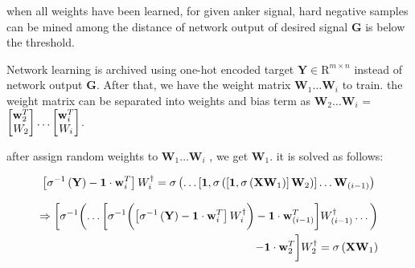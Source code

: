 \documentclass[runningheads]{llncs}
\begin{document}
when all weights have been learned, for given anker signal, hard negative samples can be mined among the distance of network output of desired signal $\mathbf{G}$ is below the threshold.

Network learning is archived using one-hot encoded target $\mathbf{Y}\in{\mathrm{R}}^{m \times n}$ instead of network output $\mathbf{G}$.
After that, we have the weight matrix $\mathbf{W}_{1}\dots\mathbf{W}_{i}$ to train. the weight matrix can be separated into weights and bias term as
$\mathbf{W}_{2}\dots\mathbf{W}_{i}$ = 
$\begin{bmatrix}
\mathbf{w}_{2}^{T}\\\mathnormal{W}_{2}
\end{bmatrix}
\dots
\begin{bmatrix}
\mathbf{w}_{i}^{T}\\\mathnormal{W}_{i}
\end{bmatrix}$.

after assign random weights to $\mathbf{W}_{1}\dots\mathbf{W}_{i}$ , we get $\mathbf{W}_{1}$. it is solved as follows:

\begin{equation}
    \left[\sigma^{-1}\left(\mathbf{Y}\right)-\mathbf{1}\cdot\mathbf{w}_{i}^{T}\right]\mathnormal{W}_{i}^\dagger = 
    \sigma\left(\dots\left[\mathbf{1},\sigma\left(\left[\mathbf{1},\sigma\left(\mathbf{X}\mathbf{W}_{1}\right)\right]\mathbf{W}_{2}\right)\right]\dots\mathbf{W}_{(i-1)}\right)
\end{equation}

\begin{equation}
    \begin{aligned}
        \Rightarrow
        \biggl[\sigma^{-1}\biggl(
        \dots
        \biggl[\sigma^{-1}\biggl(
            \left[\sigma^{-1}\left(\mathbf{Y}\right)-\mathbf{1}\cdot\mathbf{w}_{i}^{T}\right]\mathnormal{W}_{i}^\dagger
        \biggr)
        - \mathbf{1}\cdot\mathbf{w}_{(i-1)}^{T}\biggr]\mathnormal{W}_{(i-1)}^{\dagger}
        \dots\biggr)\\
        - \mathbf{1}\cdot\mathbf{w}_{2}^{T}\biggr]\mathnormal{W}_{2}^{\dagger} 
        = \sigma\left(\mathbf{X}\mathbf{W}_{1}\right)
    \end{aligned}
\end{equation}
\end{document}
